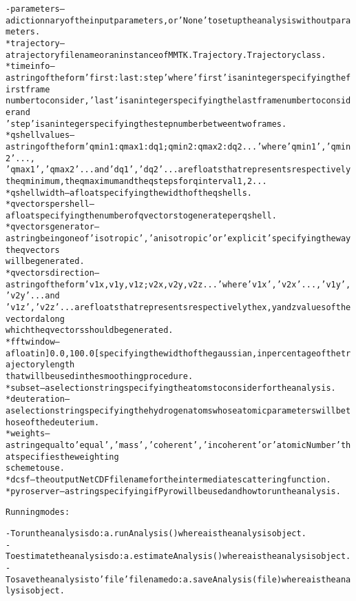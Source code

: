 \begin{alltt}
    - {\textbar}parameters{\textbar} -- a dictionnary of the input parameters, or 'None' to set up the analysis without parameters.
        * trajectory        -- a trajectory file name or an instance of MMTK.Trajectory.Trajectory class.
        * timeinfo          -- a string of the form 'first:last:step' where 'first' is an integer specifying the first frame 
                               number to consider, 'last' is an integer specifying the last frame number to consider and 
                               'step' is an integer specifying the step number between two frames.
        * qshellvalues      -- a string of the form 'qmin1:qmax1:dq1;qmin2:qmax2:dq2...' where 'qmin1', 'qmin2' ... , 
                               'qmax1', 'qmax2' ... and 'dq1', 'dq2' ... are floats that represents respectively 
                               the q minimum, the q maximum and the q steps for q interval 1, 2 ...
        * qshellwidth       -- a float specifying the width of the q shells.
        * qvectorspershell  -- a float specifying the number of q vectors to generate per q shell.
        * qvectorsgenerator -- a string being one of 'isotropic', 'anisotropic' or 'explicit' specifying the way the q vectors
                               will be generated.
        * qvectorsdirection -- a string of the form 'v1x,v1y,v1z;v2x,v2y,v2z...' where 'v1x', 'v2x' ..., 'v1y', 'v2y' ... and
                               'v1z', 'v2z' ... are floats that represents respectively the x, y and z values of the vectord along 
                               which the q vectors should be generated.
        * fftwindow         -- a float in ]0.0,100.0[ specifying the width of the gaussian, in percentage of the trajectory length
                               that will be used in the smoothing procedure.
        * subset            -- a selection string specifying the atoms to consider for the analysis.
        * deuteration       -- a selection string specifying the hydrogen atoms whose atomic parameters will be those of the deuterium.
        * weights           -- a string equal to 'equal', 'mass', 'coherent' , 'incoherent' or 'atomicNumber' that specifies the weighting
                               scheme to use.
        * dcsf              -- the output NetCDF file name for the intermediate scattering function.
        * pyroserver        -- a string specifying if Pyro will be used and how to run the analysis.
    
Running modes:

    - To run the analysis do: a.runAnalysis() where a is the analysis object.
    - To estimate the analysis do: a.estimateAnalysis() where a is the analysis object.
    - To save the analysis to 'file' file name do: a.saveAnalysis(file) where a is the analysis object.
    
\end{alltt}



